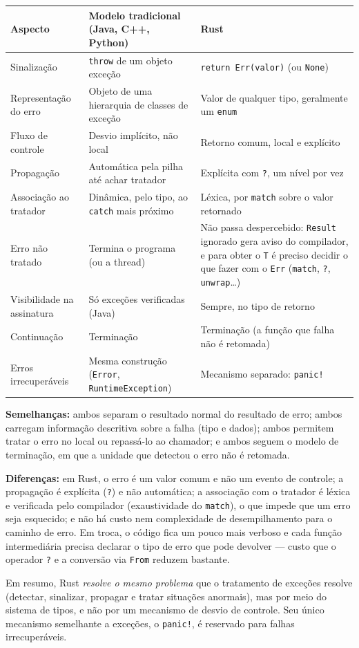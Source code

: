 \documentclass[11pt,a4paper]{article}
\newcommand{\code}[1]{\texttt{#1}}
\begin{document}
\begin{tabularx}{\linewidth}{@{}p{3.1cm}XX@{}}
\toprule
\textbf{Aspecto} & \textbf{Modelo tradicional (Java, C++, Python)} & \textbf{Rust} \\
\midrule
Sinalização & \code{throw} de um objeto exceção & \code{return Err(valor)} (ou \code{None}) \\
\addlinespace
Representação do erro & Objeto de uma hierarquia de classes de exceção & Valor de qualquer tipo, geralmente um \code{enum} \\
\addlinespace
Fluxo de controle & Desvio implícito, não local & Retorno comum, local e explícito \\
\addlinespace
Propagação & Automática pela pilha até achar tratador & Explícita com \code{?}, um nível por vez \\
\addlinespace
Associação ao tratador & Dinâmica, pelo tipo, ao \code{catch} mais próximo & Léxica, por \code{match} sobre o valor retornado \\
\addlinespace
Erro não tratado & Termina o programa (ou a thread) & Não passa despercebido: \code{Result} ignorado gera aviso do compilador, e para obter o \code{T} é preciso decidir o que fazer com o \code{Err} (\code{match}, \code{?}, \code{unwrap}\dots) \\
\addlinespace
Visibilidade na assinatura & Só exceções verificadas (Java) & Sempre, no tipo de retorno \\
\addlinespace
Continuação & Terminação & Terminação (a função que falha não é retomada) \\
\addlinespace
Erros irrecuperáveis & Mesma construção (\code{Error}, \code{RuntimeException}) & Mecanismo separado: \code{panic!} \\
\bottomrule
\end{tabularx}

\textbf{Semelhanças:} ambos separam o resultado normal do resultado de
erro; ambos carregam informação descritiva sobre a falha (tipo e dados);
ambos permitem tratar o erro no local ou repassá-lo ao chamador; e ambos
seguem o modelo de terminação, em que a unidade que detectou o erro não é
retomada.

\textbf{Diferenças:} em Rust, o erro é um valor comum e não um evento de
controle; a propagação é explícita (\code{?}) e não automática; a
associação com o tratador é léxica e verificada pelo compilador
(exaustividade do \code{match}), o que impede que um erro seja esquecido;
e não há custo nem complexidade de desempilhamento para o caminho de erro.
Em troca, o código fica um pouco mais verboso e cada função intermediária
precisa declarar o tipo de erro que pode devolver --- custo que o
operador \code{?} e a conversão via \code{From} reduzem bastante.

Em resumo, Rust \emph{resolve o mesmo problema} que o tratamento de
exceções resolve (detectar, sinalizar, propagar e tratar situações
anormais), mas por meio do sistema de tipos, e não por um mecanismo de
desvio de controle. Seu único mecanismo semelhante a exceções, o
\code{panic!}, é reservado para falhas irrecuperáveis.
\end{document}
